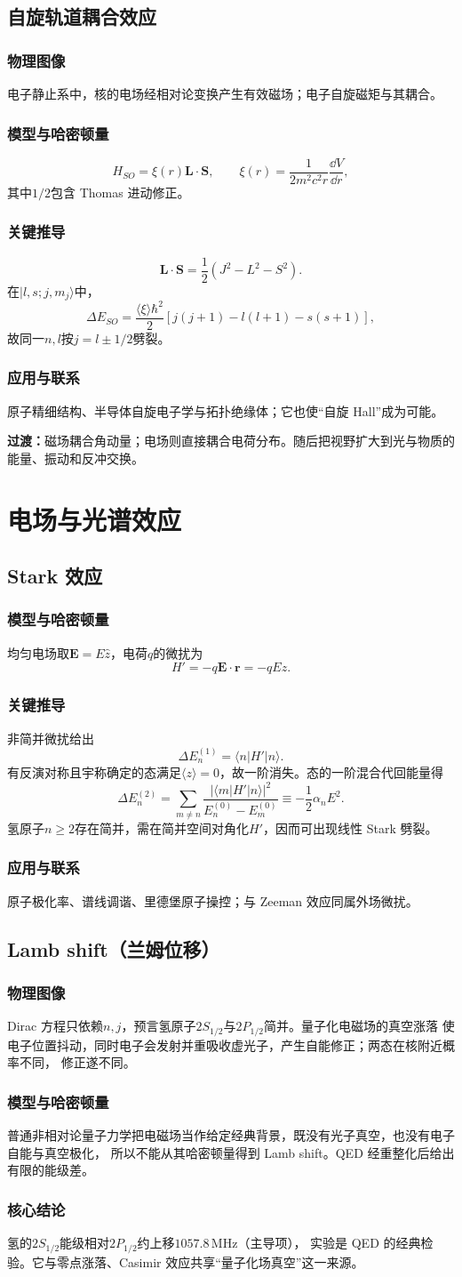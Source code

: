 \documentclass[12pt,a4paper,openany,fontset=fandol]{ctexrep}
\newcommand{\Physical}{\subsection*{物理图像}}
\newcommand{\Model}{\subsection*{模型与哈密顿量}}
\newcommand{\Derivation}{\subsection*{关键推导}}
\newcommand{\Conclusion}{\subsection*{核心结论}}
\newcommand{\Application}{\subsection*{应用与联系}}
\newcommand{\trans}[1]{\par\medskip\noindent\textcolor{blue!55!black}{\textbf{过渡：}}#1\par\medskip}
\begin{document}
\section{自旋轨道耦合效应}
\Physical
电子静止系中，核的电场经相对论变换产生有效磁场；电子自旋磁矩与其耦合。
\Model
\begin{equation}H_{SO}=\xi(r)\bm L\cdot\bm S,\qquad
\xi(r)=\frac{1}{2m^2c^2r}\frac{\dd V}{\dd r},\end{equation}
其中$1/2$包含 Thomas 进动修正。
\Derivation
\begin{equation}\bm L\cdot\bm S=\frac12(J^2-L^2-S^2).\end{equation}
在$|l,s;j,m_j\rangle$中，
\[
\Delta E_{SO}=\frac{\langle\xi\rangle\hbar^2}{2}
[j(j+1)-l(l+1)-s(s+1)],
\]
故同一$n,l$按$j=l\pm1/2$劈裂。
\Application
原子精细结构、半导体自旋电子学与拓扑绝缘体；它也使“自旋 Hall”成为可能。
\trans{磁场耦合角动量；电场则直接耦合电荷分布。随后把视野扩大到光与物质的能量、振动和反冲交换。}

\chapter{电场与光谱效应}
\section{Stark 效应}
\Model
均匀电场取$\bm E=E\hat z$，电荷$q$的微扰为
\begin{equation}H'=-q\bm E\cdot\bm r=-qEz.\end{equation}
\Derivation
非简并微扰给出
\begin{equation}\Delta E_n^{(1)}=\langle n|H'|n\rangle.\end{equation}
有反演对称且宇称确定的态满足$\langle z\rangle=0$，故一阶消失。态的一阶混合代回能量得
\begin{equation}\Delta E_n^{(2)}=\sum_{m\ne n}
\frac{|\langle m|H'|n\rangle|^2}{E_n^{(0)}-E_m^{(0)}}\equiv-\frac12\alpha_nE^2.\end{equation}
氢原子$n\ge2$存在简并，需在简并空间对角化$H'$，因而可出现线性 Stark 劈裂。
\Application
原子极化率、谱线调谐、里德堡原子操控；与 Zeeman 效应同属外场微扰。

\section{Lamb shift（兰姆位移）}
\Physical
Dirac 方程只依赖$n,j$，预言氢原子$2S_{1/2}$与$2P_{1/2}$简并。量子化电磁场的真空涨落
使电子位置抖动，同时电子会发射并重吸收虚光子，产生自能修正；两态在核附近概率不同，
修正遂不同。
\Model
普通非相对论量子力学把电磁场当作给定经典背景，既没有光子真空，也没有电子自能与真空极化，
所以不能从其哈密顿量得到 Lamb shift。QED 经重整化后给出有限的能级差。
\Conclusion
氢的$2S_{1/2}$能级相对$2P_{1/2}$约上移$1057.8\,\mathrm{MHz}$（主导项），
实验是 QED 的经典检验。它与零点涨落、Casimir 效应共享“量子化场真空”这一来源。
\end{document}

